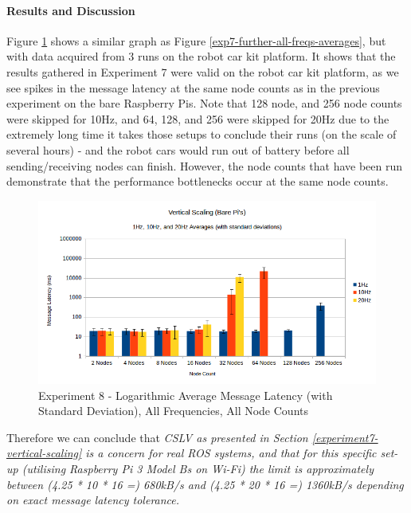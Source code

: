 \documentclass[../dissertation.tex]{subfiles}
\begin{document}
\paragraph{Results and Discussion} Figure \ref{exp8-all-freqs-averages} shows a similar graph as Figure \ref{exp7-further-all-freqs-averages}, but with data acquired from 3 runs on the robot car kit platform. It shows that the results gathered in Experiment 7 were valid on the robot car kit platform, as we see spikes in the message latency at the same node counts as in the previous experiment on the bare Raspberry Pis. Note that 128 node, and 256 node counts were skipped for 10Hz, and 64, 128, and 256 were skipped for 20Hz due to the extremely long time it takes those setups to conclude their runs (on the scale of several hours) - and the robot cars would run out of battery before all sending/receiving nodes can finish. However, the node counts that have been run demonstrate that the performance bottlenecks occur at the same node counts.

\begin{figure}[H]
\centering
\includegraphics[width=\textwidth]{images/experiment9/vertical_scaling_all_freqs_log_avg_msg_latency.png}
\caption{Experiment 8 - Logarithmic Average Message Latency (with Standard Deviation), All Frequencies, All Node Counts}
\label{exp8-all-freqs-averages}
\end{figure}

Therefore we can conclude that \textit{CSLV as presented in Section \ref{experiment7-vertical-scaling} is a concern for real ROS systems, and that for this specific set-up (utilising Raspberry Pi 3 Model Bs on Wi-Fi) the limit is approximately between (4.25 * 10 * 16 =) 680kB/s and (4.25 * 20 * 16 =) 1360kB/s depending on exact message latency tolerance.}
\end{document}
